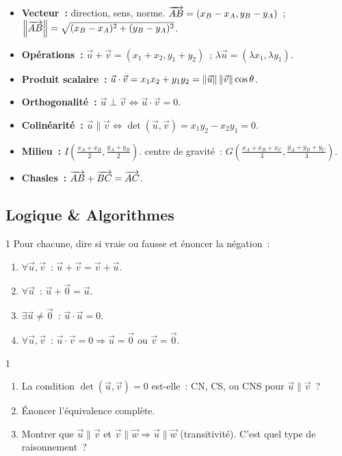 \begin{bilan}
\begin{itemize}
  \item \textbf{Vecteur~:} direction, sens, norme.
        $\overrightarrow{AB}=(x_B-x_A, y_B-y_A)$~;
        $\left\|\overrightarrow{AB}\right\|=\sqrt{(x_B-x_A)^2+(y_B-y_A)^2}$.
  \item \textbf{Op\'erations~:} $\vec{u}+\vec{v}=(x_1+x_2,y_1+y_2)$~;
        $\lambda\vec{u}=(\lambda x_1,\lambda y_1)$.
  \item \textbf{Produit scalaire~:}
        $\vec{u}\cdot\vec{v}=x_1x_2+y_1y_2=\left\|\vec{u}\right\|\left\|\vec{v}\right\|\cos\theta$.
  \item \textbf{Orthogonalit\'e~:} $\vec{u}\perp\vec{v}\Leftrightarrow\vec{u}\cdot\vec{v}=0$.
  \item \textbf{Colin\'earit\'e~:} $\vec{u}\parallel\vec{v}
        \Leftrightarrow\det(\vec{u},\vec{v})=x_1y_2-x_2y_1=0$.
  \item \textbf{Milieu~:} $I\!\left(\frac{x_A+x_B}{2},\frac{y_A+y_B}{2}\right)$.
        centre de gravité~: $G\!\left(\frac{x_A+x_B+x_C}{3},\frac{y_A+y_B+y_C}{3}\right)$.
  \item \textbf{Chasles~:} $\overrightarrow{AB}+\overrightarrow{BC}=\overrightarrow{AC}$.
\end{itemize}

\subsection*{Logique \& Algorithmes}

\begin{exo}{1}
Pour chacune, dire si vraie ou fausse et \'enoncer la n\'egation~:
\begin{enumerate}
  \item $\forall\vec{u},\vec{v}$~: $\vec{u}+\vec{v}=\vec{v}+\vec{u}$.
  \item $\forall\vec{u}$~: $\vec{u}+\vec{0}=\vec{u}$.
  \item $\exists\vec{u}\ne\vec{0}$~: $\vec{u}\cdot\vec{u}=0$.
  \item $\forall\vec{u},\vec{v}$~: $\vec{u}\cdot\vec{v}=0\Rightarrow\vec{u}=\vec{0}$ ou $\vec{v}=\vec{0}$.
\end{enumerate}
\end{exo}

\begin{exo}{1}
\begin{enumerate}
  \item La condition $\det(\vec{u},\vec{v})=0$ est-elle~: CN, CS, ou CNS pour $\vec{u}\parallel\vec{v}$~?
  \item \'Enoncer l'\'equivalence compl\`ete.
  \item Montrer que $\vec{u}\parallel\vec{v}$ et $\vec{v}\parallel\vec{w}\Rightarrow\vec{u}\parallel\vec{w}$
        (transitivit\'e). C'est quel type de raisonnement~?
\end{enumerate}
\end{exo}


\end{bilan}
